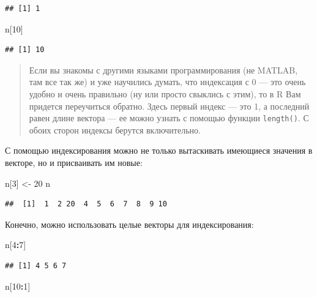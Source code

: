 \documentclass[]{book}
\newenvironment{Shaded}{\begin{snugshade}}{\end{snugshade}}
\newcommand{\DecValTok}[1]{\textcolor[rgb]{0.00,0.00,0.81}{#1}}
\newcommand{\NormalTok}[1]{#1}
\newcommand{\OperatorTok}[1]{\textcolor[rgb]{0.81,0.36,0.00}{\textbf{#1}}}
\newcommand{\StringTok}[1]{\textcolor[rgb]{0.31,0.60,0.02}{#1}}
\begin{document}
\begin{verbatim}
## [1] 1
\end{verbatim}

\begin{Shaded}
\begin{Highlighting}[]
\NormalTok{n[}\DecValTok{10}\NormalTok{]}
\end{Highlighting}
\end{Shaded}

\begin{verbatim}
## [1] 10
\end{verbatim}

\begin{quote}
Если вы знакомы с другими языками программирования (не MATLAB, там все так же) и уже научились думать, что индексация с 0 --- это очень удобно и очень правильно (ну или просто свыклись с этим), то в R Вам придется переучиться обратно. Здесь первый индекс --- это 1, а последний равен длине вектора --- ее можно узнать с помощью функции \texttt{length()}. С обоих сторон индексы берутся включительно.
\end{quote}

С помощью индексирования можно не только вытаскивать имеющиеся значения в векторе, но и присваивать им новые:

\begin{Shaded}
\begin{Highlighting}[]
\NormalTok{n[}\DecValTok{3}\NormalTok{] <-}\StringTok{ }\DecValTok{20}
\NormalTok{n}
\end{Highlighting}
\end{Shaded}

\begin{verbatim}
##  [1]  1  2 20  4  5  6  7  8  9 10
\end{verbatim}

Конечно, можно использовать целые векторы для индексирования:

\begin{Shaded}
\begin{Highlighting}[]
\NormalTok{n[}\DecValTok{4}\OperatorTok{:}\DecValTok{7}\NormalTok{]}
\end{Highlighting}
\end{Shaded}

\begin{verbatim}
## [1] 4 5 6 7
\end{verbatim}

\begin{Shaded}
\begin{Highlighting}[]
\NormalTok{n[}\DecValTok{10}\OperatorTok{:}\DecValTok{1}\NormalTok{]}
\end{Highlighting}
\end{Shaded}
\end{document}
